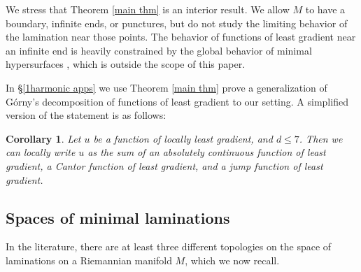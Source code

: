 \documentclass[reqno,11pt]{amsart}
\newcommand*\dif{\mathop{}\!\mathrm{d}}
\newcommand{\dfn}[1]{\emph{#1}\index{#1}}
\newtheorem{corollary}[theorem]{Corollary}
\theoremstyle{definition}
\numberwithin{equation}{section}
\begin{document}
We stress that Theorem \ref{main thm} is an interior result.
We allow $M$ to have a boundary, infinite ends, or punctures, but do not study the limiting behavior of the lamination near those points.
The behavior of functions of least gradient near an infinite end is heavily constrained by the global behavior of minimal hypersurfaces \cite[\S4.4]{górny2021}, which is outside the scope of this paper.

In \S\ref{1harmonic apps} we use Theorem \ref{main thm} prove a generalization of G\'orny's decomposition of functions of least gradient \cite[Theorem 1.2]{górny2017planar} to our setting.
A simplified version of the statement is as follows:

\begin{corollary}
Let $u$ be a function of locally least gradient, and $d \leq 7$.
Then we can locally write $u$ as the sum of an absolutely continuous function of least gradient, a Cantor function of least gradient, and a jump function of least gradient.
\end{corollary}


\subsection{Spaces of minimal laminations}\label{LamSpace section}
In the literature, there are at least three different topologies on the space of laminations on a Riemannian manifold $M$, which we now recall.
\end{document}
